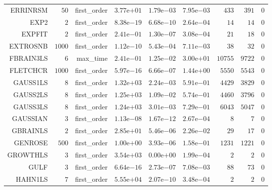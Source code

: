 \begin{longtable}{rrrrrrrrr}
ERRINRSM & \(    50\) & first\_order & \( 3.77\)e\(+01\) & \( 1.79\)e\(-03\) & \( 7.95\)e\(-03\) & \(   433\) & \(   391\) & \(     0\) \\
EXP2 & \(     2\) & first\_order & \( 8.38\)e\(-19\) & \( 6.68\)e\(-10\) & \( 2.64\)e\(-04\) & \(    14\) & \(    14\) & \(     0\) \\
EXPFIT & \(     2\) & first\_order & \( 2.41\)e\(-01\) & \( 1.30\)e\(-07\) & \( 3.08\)e\(-04\) & \(    21\) & \(    18\) & \(     0\) \\
EXTROSNB & \(  1000\) & first\_order & \( 1.12\)e\(-10\) & \( 5.43\)e\(-04\) & \( 7.11\)e\(-03\) & \(    38\) & \(    32\) & \(     0\) \\
FBRAIN3LS & \(     6\) & max\_time & \( 2.41\)e\(-01\) & \( 1.25\)e\(-02\) & \( 3.00\)e\(+01\) & \( 10755\) & \(  9722\) & \(     0\) \\
FLETCHCR & \(  1000\) & first\_order & \( 5.97\)e\(-16\) & \( 6.66\)e\(-07\) & \( 1.44\)e\(+00\) & \(  5550\) & \(  5543\) & \(     0\) \\
GAUSS1LS & \(     8\) & first\_order & \( 1.32\)e\(+03\) & \( 2.24\)e\(-03\) & \( 5.91\)e\(-01\) & \(  4429\) & \(  3829\) & \(     0\) \\
GAUSS2LS & \(     8\) & first\_order & \( 1.25\)e\(+03\) & \( 1.09\)e\(-02\) & \( 5.74\)e\(-01\) & \(  4460\) & \(  3796\) & \(     0\) \\
GAUSS3LS & \(     8\) & first\_order & \( 1.24\)e\(+03\) & \( 3.01\)e\(-03\) & \( 7.29\)e\(-01\) & \(  6043\) & \(  5047\) & \(     0\) \\
GAUSSIAN & \(     3\) & first\_order & \( 1.13\)e\(-08\) & \( 1.67\)e\(-12\) & \( 2.67\)e\(-04\) & \(     8\) & \(     7\) & \(     0\) \\
GBRAINLS & \(     2\) & first\_order & \( 2.85\)e\(+01\) & \( 5.46\)e\(-06\) & \( 2.26\)e\(-02\) & \(    29\) & \(    17\) & \(     0\) \\
GENROSE & \(   500\) & first\_order & \( 1.00\)e\(+00\) & \( 3.93\)e\(-06\) & \( 1.58\)e\(-01\) & \(  1231\) & \(  1221\) & \(     0\) \\
GROWTHLS & \(     3\) & first\_order & \( 3.54\)e\(+03\) & \( 0.00\)e\(+00\) & \( 1.99\)e\(-04\) & \(     2\) & \(     2\) & \(     0\) \\
GULF & \(     3\) & first\_order & \( 6.64\)e\(-16\) & \( 2.73\)e\(-07\) & \( 7.08\)e\(-03\) & \(    88\) & \(    73\) & \(     0\) \\
HAHN1LS & \(     7\) & first\_order & \( 5.55\)e\(+04\) & \( 2.07\)e\(-10\) & \( 3.48\)e\(-04\) & \(     2\) & \(     2\) & \(     0\) \\

\end{longtable}
